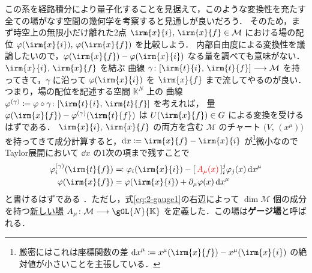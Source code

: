 \documentclass[TQFT_main]{subfiles}
\begin{document}
この系を経路積分により量子化することを見据えて，このような変換性を充たす全ての場がなす空間の幾何学を考察すると見通しが良いだろう．
そのため，まず時空上の無限小だけ離れた2点 $\irm{x}{i},\, \irm{x}{f} \in \mathcal{M}$ における場の配位 $\varphi(\irm{x}{i}),\, \varphi(\irm{x}{f})$ を比較しよう．
内部自由度による変換性を議論したいので，$\varphi (\irm{x}{f}) - \varphi(\irm{x}{i})$ なる量を調べても意味がない．$\irm{x}{i},\, \irm{x}{f}$ を結ぶ \cinfty 曲線 $\gamma \colon [\irm{t}{i},\, \irm{t}{f}] \lto \mathcal{M}$ を持ってきて，$\gamma$ に沿って $\varphi(\irm{x}{i})$ を $\irm{x}{f}$ まで流してやるのが良い．つまり，場の配位を記述する空間 $\mathbb{K}^N$ 上の \cinfty 曲線 $\varphi^{(\gamma)} \coloneqq \varphi \circ \gamma \colon [\irm{t}{i},\, \irm{t}{f}]$ を考えれば，
量 $\varphi (\irm{x}{f}) - \varphi^{(\gamma)}(\irm{t}{f})$ は $U(\irm{x}{f}) \in G$ による変換を受けるはずである．
$\irm{x}{i},\, \irm{x}{f}$ の両方を含む $\mathcal{M}$ のチャート $\bigl( V,\, (x^\mu) \bigr)$ を持ってきて成分計算すると，$\dd{x} \coloneqq \irm{x}{f} - \irm{x}{i}$ が\footnote{厳密にはこれは座標関数の差 $\dd{x}^\mu \coloneqq x^\mu(\irm{x}{f}) - x^\mu(\irm{x}{i})$ の絶対値が小さいことを主張している．}微小なのでTaylor展開において $\dd{x}$ の1次の項まで残すことで
\begin{align}
    \varphi^{(\gamma)}_i(\irm{t}{f}) &\eqqcolon \varphi_i (\irm{x}{i}) - [\, \textcolor{red}{A_\mu(x)} \,]^j_i \varphi_j (x) \dd{x}^\mu \label{eq:2-gauge1} \\
    \varphi(\irm{x}{f}) &= \varphi (\irm{x}{i}) + \partial_\mu \varphi (x) \dd{x}^\mu
\end{align}
と書けるはずである
．ただし，式\eqref{eq:2-gauge1}の右辺によって $\dim \mathcal{M}$ 個の成分を持つ\underline{新しい場} $A_\mu \colon \mathcal{M} \lto \gGL{N}{\mathbb{K}}$ を定義した．この場は\textbf{ゲージ場}と呼ばれる．
\end{document}
